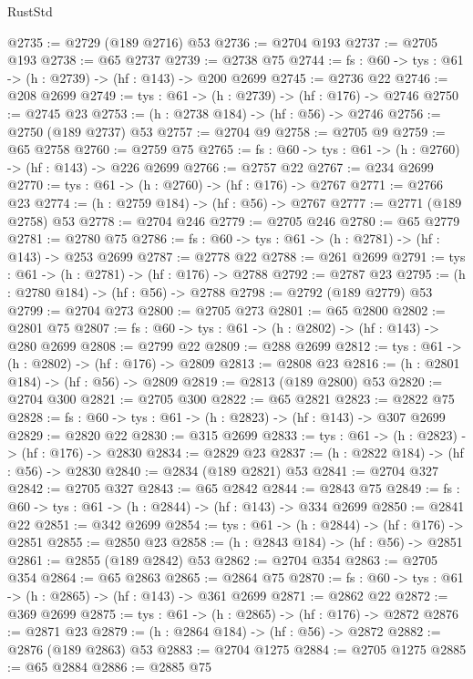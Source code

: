 \begin{lexlean}{RustStd}
\begin{coremodule}
@2735 := @2729 (@189 @2716) @53
@2736 := @2704 @193
@2737 := @2705 @193
@2738 := @65 @2737
@2739 := @2738 @75
@2744 := {fs : @60} -> {tys : @61} -> (h : @2739) -> (hf : @143) -> @200 @2699
@2745 := @2736 @22
@2746 := @208 @2699
@2749 := {tys : @61} -> (h : @2739) -> (hf : @176) -> @2746
@2750 := @2745 @23
@2753 := (h : @2738 @184) -> (hf : @56) -> @2746
@2756 := @2750 (@189 @2737) @53
@2757 := @2704 @9
@2758 := @2705 @9
@2759 := @65 @2758
@2760 := @2759 @75
@2765 := {fs : @60} -> {tys : @61} -> (h : @2760) -> (hf : @143) -> @226 @2699
@2766 := @2757 @22
@2767 := @234 @2699
@2770 := {tys : @61} -> (h : @2760) -> (hf : @176) -> @2767
@2771 := @2766 @23
@2774 := (h : @2759 @184) -> (hf : @56) -> @2767
@2777 := @2771 (@189 @2758) @53
@2778 := @2704 @246
@2779 := @2705 @246
@2780 := @65 @2779
@2781 := @2780 @75
@2786 := {fs : @60} -> {tys : @61} -> (h : @2781) -> (hf : @143) -> @253 @2699
@2787 := @2778 @22
@2788 := @261 @2699
@2791 := {tys : @61} -> (h : @2781) -> (hf : @176) -> @2788
@2792 := @2787 @23
@2795 := (h : @2780 @184) -> (hf : @56) -> @2788
@2798 := @2792 (@189 @2779) @53
@2799 := @2704 @273
@2800 := @2705 @273
@2801 := @65 @2800
@2802 := @2801 @75
@2807 := {fs : @60} -> {tys : @61} -> (h : @2802) -> (hf : @143) -> @280 @2699
@2808 := @2799 @22
@2809 := @288 @2699
@2812 := {tys : @61} -> (h : @2802) -> (hf : @176) -> @2809
@2813 := @2808 @23
@2816 := (h : @2801 @184) -> (hf : @56) -> @2809
@2819 := @2813 (@189 @2800) @53
@2820 := @2704 @300
@2821 := @2705 @300
@2822 := @65 @2821
@2823 := @2822 @75
@2828 := {fs : @60} -> {tys : @61} -> (h : @2823) -> (hf : @143) -> @307 @2699
@2829 := @2820 @22
@2830 := @315 @2699
@2833 := {tys : @61} -> (h : @2823) -> (hf : @176) -> @2830
@2834 := @2829 @23
@2837 := (h : @2822 @184) -> (hf : @56) -> @2830
@2840 := @2834 (@189 @2821) @53
@2841 := @2704 @327
@2842 := @2705 @327
@2843 := @65 @2842
@2844 := @2843 @75
@2849 := {fs : @60} -> {tys : @61} -> (h : @2844) -> (hf : @143) -> @334 @2699
@2850 := @2841 @22
@2851 := @342 @2699
@2854 := {tys : @61} -> (h : @2844) -> (hf : @176) -> @2851
@2855 := @2850 @23
@2858 := (h : @2843 @184) -> (hf : @56) -> @2851
@2861 := @2855 (@189 @2842) @53
@2862 := @2704 @354
@2863 := @2705 @354
@2864 := @65 @2863
@2865 := @2864 @75
@2870 := {fs : @60} -> {tys : @61} -> (h : @2865) -> (hf : @143) -> @361 @2699
@2871 := @2862 @22
@2872 := @369 @2699
@2875 := {tys : @61} -> (h : @2865) -> (hf : @176) -> @2872
@2876 := @2871 @23
@2879 := (h : @2864 @184) -> (hf : @56) -> @2872
@2882 := @2876 (@189 @2863) @53
@2883 := @2704 @1275
@2884 := @2705 @1275
@2885 := @65 @2884
@2886 := @2885 @75

\end{coremodule}
\end{lexlean}
